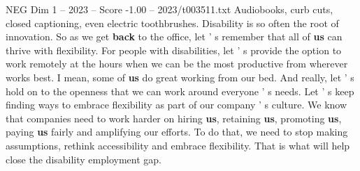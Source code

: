 \begin{textsample}{NEG Dim 1 – 2023 – Score -1.00 – 2023/t003511.txt}
Audiobooks, curb cuts, closed captioning, even electric toothbrushes.
Disability is so often the root of innovation.
So as we get \textbf{back} to the office, let ' s remember that all of \textbf{us} can thrive with flexibility.
For people with disabilities, let ' s provide the option to work remotely at the hours when we can be the most productive from wherever works best.
I mean, some of \textbf{us} do great working from our bed.
And really, let ' s hold on to the openness that we can work around everyone ' s needs.
Let ' s keep finding ways to embrace flexibility as part of our company ' s culture.
We know that companies need to work harder on hiring \textbf{us}, retaining \textbf{us}, promoting \textbf{us}, paying \textbf{us} fairly and amplifying our efforts.
To do that, we need to stop making assumptions, rethink accessibility and embrace flexibility.
That is what will help close the disability employment gap.

\end{textsample}

